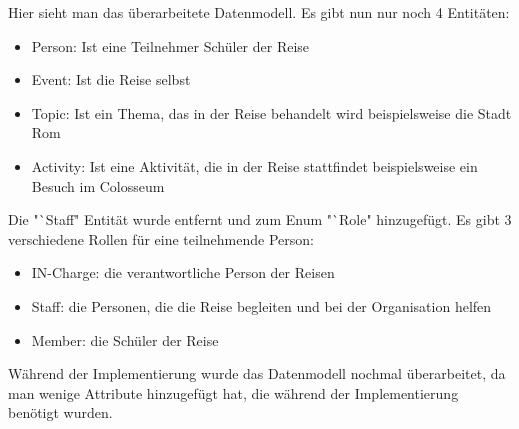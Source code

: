 Hier sieht man das überarbeitete Datenmodell. Es gibt nun nur noch 4 Entitäten:

\begin{itemize}
    \item Person: Ist eine Teilnehmer Schüler der Reise
    \item Event: Ist die Reise selbst
    \item Topic: Ist ein Thema, das in der Reise behandelt wird beispielsweise die Stadt Rom
    \item Activity: Ist eine Aktivität, die in der Reise stattfindet beispielsweise ein Besuch im Colosseum
\end{itemize}

Die "`Staff" Entität wurde entfernt und zum Enum "`Role" hinzugefügt. Es gibt 3 verschiedene Rollen für eine teilnehmende Person:

\begin{itemize}
    \item IN-Charge: die verantwortliche Person der Reisen
    \item Staff: die Personen, die die Reise begleiten und bei der Organisation helfen
    \item Member: die Schüler der Reise 
\end{itemize}

Während der Implementierung wurde das Datenmodell nochmal überarbeitet, da man wenige Attribute hinzugefügt hat, die während der Implementierung benötigt wurden. 

